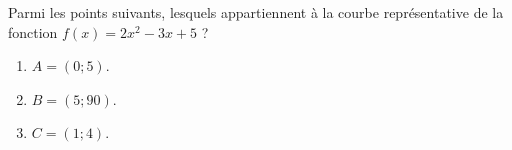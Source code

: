 
\begin{exercice}\label{exosmath-0388}

Parmi les points suivants, lesquels appartiennent à la courbe représentative de la fonction \( f(x)=2x^2-3x+5\) ?
\begin{multicols}{3}
    \begin{enumerate}
        \item
            \( A=(0;5)\).
        \item
            \( B=(5;90)\).
        \item
            \( C=(1;4)\).
    \end{enumerate}
\end{multicols}

\end{exercice}
